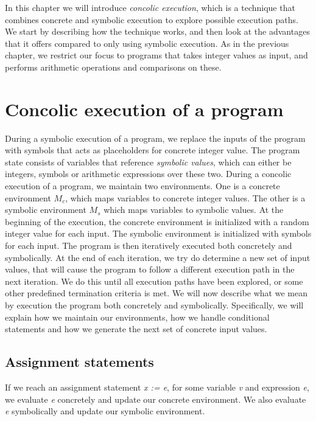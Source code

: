 In this chapter we will introduce \emph{concolic execution}, which is a technique that combines concrete and symbolic execution to explore possible execution paths. We start by describing how the technique works, and then look at the advantages that it offers compared to only using symbolic execution. As in the previous chapter, we restrict our focus to programs that takes integer values as input, and performs arithmetic operations and comparisons on these. 

\section{Concolic execution of a program}
	During a symbolic execution of a program, we replace the inputs of the program with symbols that acts as placeholders for concrete integer value. The program state consists of variables that reference \emph{symbolic values}, which can either be integers, symbols or arithmetic expressions over these two. During a concolic execution of a program, we maintain two environments. One is a concrete environment $M_c$, which maps variables to concrete integer values. The other is a symbolic environment $M_s$ which maps variables to symbolic values. At the beginning of the execution, the concrete environment is initialized with a random integer value for each input. The symbolic environment is initialized with symbols for each input. 
	The program is then iteratively executed both concretely and symbolically. At the end of each iteration, we try do determine a new set of input values, that will cause the program to follow a different execution path in the next iteration. We do this until all execution paths have been explored, or some other predefined termination criteria is met. We will now describe what we mean by execution the program both concretely and symbolically. Specifically, we will explain how we maintain our environments, how we handle conditional statements and how we generate the next set of concrete input values.
	
	\subsection{Assignment statements} 
	
	If we reach an assignment statement \textsl{x := e}, for some variable \textsl{v} and expression \textsl{e}, we evaluate \textsl{e} concretely and update our concrete environment. We also evaluate \textsl{e} symbolically and update our symbolic environment. 
	
